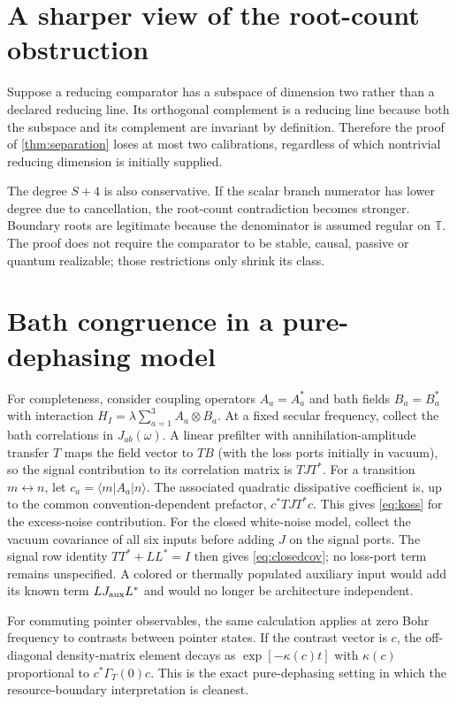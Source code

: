 \documentclass[11pt]{article}
\theoremstyle{definition}
\theoremstyle{remark}
\newcommand{\T}{\mathbb{T}}
\begin{document}
\appendix
\section{A sharper view of the root-count obstruction}

Suppose a reducing comparator has a subspace of dimension two rather than a
declared reducing line.  Its orthogonal complement is a reducing line because
both the subspace and its complement are invariant by definition.  Therefore
the proof of \cref{thm:separation} loses at most two calibrations, regardless
of which nontrivial reducing dimension is initially supplied.

The degree $S+4$ is also conservative.  If the scalar branch numerator has
lower degree due to cancellation, the root-count contradiction becomes
stronger.  Boundary roots are legitimate because the denominator is assumed
regular on $\T$.  The proof does not require the comparator to be stable,
causal, passive or quantum realizable; those restrictions only shrink its
class.

\section{Bath congruence in a pure-dephasing model}

For completeness, consider coupling operators $A_a=A_a^*$ and bath fields
$B_a=B_a^*$ with interaction $H_I=\lambda\sum_{a=1}^3A_a\otimes B_a$.
At a fixed secular frequency, collect the bath correlations in
$J_{ab}(\omega)$.  A linear prefilter with annihilation-amplitude transfer $T$
maps the field vector to $T B$ (with the loss ports initially in vacuum), so
the signal contribution to its correlation matrix is $TJT^*$.  For a
transition $m\leftrightarrow n$, let
$c_a=\langle m|A_a|n\rangle$.  The associated quadratic dissipative
coefficient is, up to the common convention-dependent prefactor,
$c^*TJT^*c$.  This gives \eqref{eq:koss} for the excess-noise contribution.
For the closed white-noise model, collect the vacuum covariance of all six
inputs before adding $J$ on the signal ports.  The signal row identity
$TT^*+LL^*=I$ then gives \eqref{eq:closedcov}; no loss-port term remains
unspecified.  A colored or thermally populated auxiliary input would add its
known term $LJ_{\rm aux}L^*$ and would no longer be architecture independent.

For commuting pointer observables, the same calculation applies at zero Bohr
frequency to contrasts between pointer states.  If the contrast vector is
$c$, the off-diagonal density-matrix element decays as
$\exp[-\kappa(c)t]$ with $\kappa(c)$ proportional to
$c^*\Gamma_T(0)c$.  This is the exact pure-dephasing setting in which the
resource-boundary interpretation is cleanest.
\end{document}
